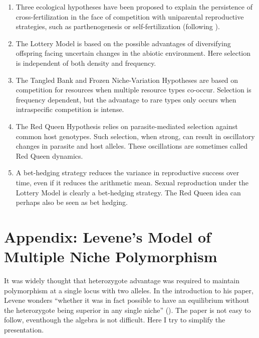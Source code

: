 \documentclass[
  letterpaper,
]{book}
\begin{document}
\begin{enumerate}
\def\labelenumi{\arabic{enumi}.}
\item
  Three ecological hypotheses have been proposed to explain the
  persistence of cross-fertilization in the face of competition with
  uniparental reproductive strategies, such as parthenogenesis or
  self-fertilization (following ).
\item
  The Lottery Model is based on the possible advantages of diversifying
  offspring facing uncertain changes in the abiotic environment. Here
  selection is independent of both density and frequency.
\item
  The Tangled Bank and Frozen Niche-Variation Hypotheses are based on
  competition for resources when multiple resource types co-occur.
  Selection is frequency dependent, but the advantage to rare types only
  occurs when intraspecific competition is intense.
\item
  The Red Queen Hypothesis relies on parasite-mediated selection against
  common host genotypes. Such selection, when strong, can result in
  oscillatory changes in parasite and host alleles. These oscillations
  are sometimes called Red Queen dynamics.
\item
  A bet-hedging strategy reduces the variance in reproductive success
  over time, even if it reduces the arithmetic mean. Sexual reproduction
  under the Lottery Model is clearly a bet-hedging strategy. The Red
  Queen idea can perhaps also be seen as bet hedging.
\end{enumerate}

\section{Appendix: Levene's Model of Multiple Niche
Polymorphism}\label{sec-app-2}

It was widely thought that heterozygote advantage was required to
maintain polymorphism at a single locus with two alleles. In the
introduction to his paper, Levene wonders ``whether it was in fact
possible to have an equilibrium without the heterozygote being superior
in any single niche'' (). The paper is
not easy to follow, eventhough the algebra is not difficult. Here I try
to simplify the presentation.
\end{document}
